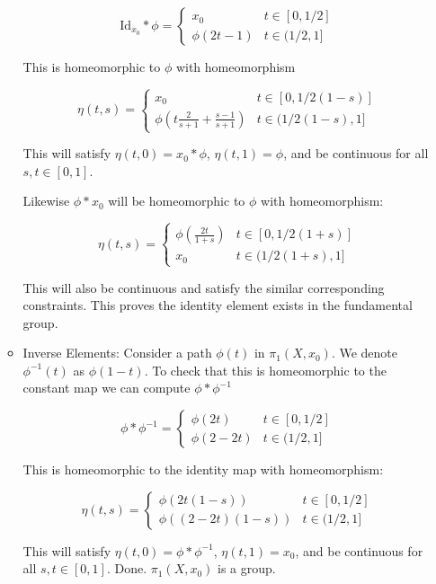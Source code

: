 \documentclass[12pt]{report}
\begin{document}
\begin{enumerate}
\begin{itemize}
  \[ \textrm{Id}_{x_0} * \phi = \begin{cases}
  x_0 & t \in [0,1/2] \\
  \phi(2t-1) & t \in (1/2,1]
  \end{cases} \]

  This is homeomorphic to $\phi$ with homeomorphism

  \[ \eta(t,s) = \begin{cases}
  x_0 & t \in [0,1/2(1-s)] \\
  \phi(t\frac{2}{s+1}+\frac{s-1}{s+1}) & t \in (1/2(1-s),1]
  \end{cases} \]

  This will satisfy $\eta(t,0) = x_0 * \phi$, $\eta(t,1) = \phi$, and be continuous for all $s,t\in [0,1]$.

  Likewise $\phi * x_0$ will be homeomorphic to $\phi$ with homeomorphism:

  \[ \eta(t,s) = \begin{cases}
  \phi(\frac{2t}{1+s}) & t \in [0,1/2(1+s)] \\
  x_0 & t \in (1/2(1+s),1]
  \end{cases} \]

  This will also be continuous and satisfy the similar corresponding constraints. This proves the identity element
  exists in the fundamental group.

  \item Inverse Elements: Consider a path $\phi(t)$ in $\pi_1(X,x_0)$. We denote $\phi^{-1}(t)$ as $\phi(1-t)$.
  To check that this is homeomorphic to the constant map we can compute $\phi*\phi^{-1}$

  \[ \phi * \phi^{-1} = \begin{cases}
  \phi(2t) & t \in [0,1/2] \\
  \phi(2-2t) & t \in (1/2,1]
  \end{cases} \]

  This is homeomorphic to the identity map with homeomorphism:

  \[ \eta(t,s) = \begin{cases}
  \phi(2t(1-s)) & t \in [0,1/2] \\
  \phi((2-2t)(1-s)) & t \in (1/2,1]
  \end{cases} \]

  This will satisfy $\eta(t,0) = \phi * \phi^{-1}$, $\eta(t,1) = x_0$, and be continuous for all $s,t\in [0,1]$.
  Done. $\pi_1(X,x_0)$ is a group.
\end{itemize}


\end{enumerate}
\end{document}
